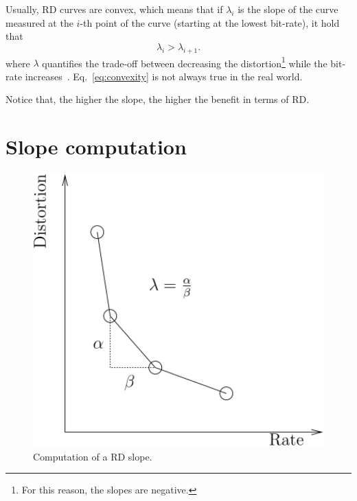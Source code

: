 Usually, RD curves are convex, which means
that if $\lambda_i$ is the slope of the curve measured at the $i$-th
point of the curve (starting at the lowest bit-rate), it hold
that
\begin{equation}
  \lambda_i > \lambda_{i+1}.
  \label{eq:convexity}
\end{equation}
where $\lambda$ quantifies the trade-off between decreasing the
distortion\footnote{For this reason, the slopes are negative.} while
the bit-rate
increases~\cite{vetterli1995wavelets,sayood2017introduction}. Eq.~\eqref{eq:convexity} is not always true in the real world.


Notice that, the higher the slope, the higher the benefit in terms of
RD.

\section{Slope computation}

\begin{figure}
  \centering
  \includegraphics[width=1.0\textwidth]{graphics/slope_computation} 
  \caption{Computation of a RD slope.}
  \label{fig:slope_computation}
\end{figure}

